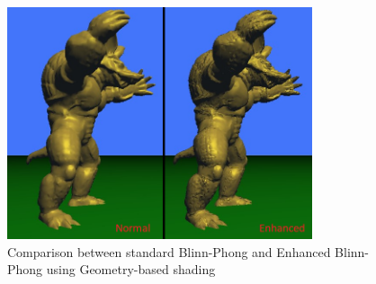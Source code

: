 \pagebreak
\begin{figure}[h]
	\centering
	\includegraphics[width=0.8\textwidth]{Images/blinn_comparison.png}
	\caption{Comparison between standard Blinn-Phong and Enhanced Blinn-Phong using Geometry-based shading}
	\label{fig:blinn_comparison}
\end{figure}

